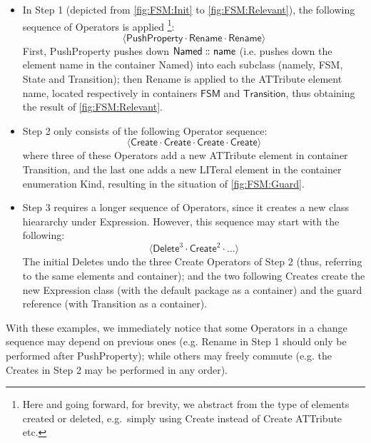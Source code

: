 \begin{itemize}
	\item In Step 1 (depicted from \cref{fig:FSM:Init} to \cref{fig:FSM:Relevant}),
	the following sequence of \textsf{Operator}s is applied
	\footnote{Here and going forward, for brevity, we abstract from the \textsf{type}
	of elements created or deleted, e.g.~simply using \textsf{Create} instead of 
	\textsf{Create ATTribute} etc.}:
	$$\langle \mathsf{PushProperty} \cdot \mathsf{Rename} \cdot \mathsf{Rename} \rangle$$
	First, \textsf{PushProperty} pushes down $\mathsf{Named} \,\colon\!\!\!\colon \mathsf{name}$
	(i.e. pushes down the \textsf{element} \textsf{name} in the \textsf{container}
	\textsf{Named})
	into each subclass (namely, \textsf{FSM}, \textsf{State} and \textsf{Transition});
	then \textsf{Rename} is applied to the \textsf{ATT}ribute \textsf{element} 
	\textsf{name}, located respectively in \textsf{container}s $\mathsf{FSM}$ and 
	$\mathsf{Transition}$, thus obtaining the result of \cref{fig:FSM:Relevant}.
	
	\item Step 2 only consists of the following \textsf{Operator} sequence:
	$$\langle \mathsf{Create} \cdot \mathsf{Create} \cdot \mathsf{Create} \cdot \mathsf{Create} \rangle$$
	where three of these \textsf{Operator}s add a new \textsf{ATT}ribute \textsf{element}
	in \textsf{container} \textsf{Transition}, and the last one adds a new 
	\textsf{LIT}eral \textsf{element} in the \textsf{container} enumeration \textsf{Kind},
	resulting in the situation of \cref{fig:FSM:Guard}.
	
	\item Step 3 requires a longer sequence of \textsf{Operator}s, since it creates
	a new class hieararchy under \textsf{Expression}. However, this sequence may
	start with the following:
	$$\langle \mathsf{Delete}^3 \cdot \mathsf{Create}^2 \cdot \ldots \rangle$$
	The initial \textsf{Delete}s undo the three \textsf{Create} \textsf{Operator}s 
	of Step 2
	(thus, referring to the same \textsf{element}s and \textsf{container}); and
	the two following \textsf{Create}s create the new \textsf{Expression} class
	(with the default package as a \textsf{container}) and the \textsf{guard}
	reference (with \textsf{Transition} as a \textsf{container}).
\end{itemize}
With these examples, we immediately notice that some \textsf{Operator}s
in a change sequence may depend on previous ones (e.g. \textsf{Rename}
in Step 1 should only be performed after \textsf{PushProperty}); while others
may freely commute (e.g. the \textsf{Create}s in Step 2 may be performed in any 
order).